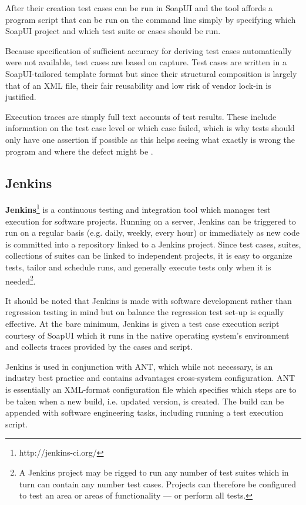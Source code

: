 \documentclass[12pt,a4paper,oneside,pdftex]{report}
\begin{document}
{{After their creation test cases can be run in SoapUI and the tool affords a program script that can be run on the command line simply by specifying which SoapUI project and which test suite or cases should be run.

Because specification of sufficient accuracy for deriving test cases automatically were not available, test cases are based on capture. Test cases are written in a SoapUI-tailored template format but since their structural composition is largely that of an XML file, their fair reusability and low risk of vendor lock-in is justified. 

Execution traces are simply full text accounts of test results. These include information on the test case level or which case failed, which is why tests should only have one assertion if possible as this helps seeing what exactly is wrong the program and where the defect might be \citep{duvall2007continuous}.

\subsection{Jenkins}

\textbf{Jenkins}\footnote{http://jenkins-ci.org/} is a continuous testing and integration tool which manages test execution for software projects. Running on a server, Jenkins can be triggered to run on a regular basis (e.g. daily, weekly, every hour) or immediately as new code is committed into a repository linked to a Jenkins project. Since test cases, suites, collections of suites can be linked to independent projects, it is easy to organize tests, tailor and schedule runs, and generally execute tests only when it is needed\footnote{A Jenkins project may be rigged to run any number of test suites which in turn can contain any number test cases. Projects can therefore be configured to test an area or areas of functionality --- or perform all tests.}.

It should be noted that Jenkins is made with software development rather than regression testing in mind but on balance the regression test set-up is equally effective. At the bare minimum, Jenkins is given a test case execution script courtesy of SoapUI which it runs in the native operating system's environment and collects traces provided by the cases and script.

Jenkins is used in conjunction with ANT, which while not necessary, is an industry best practice and contains advantages cross-system configuration. ANT is essentially an XML-format configuration file which specifies which steps are to be taken when a new build, i.e. updated version, is created. The build can be appended with software engineering tasks, including running a test execution script. 

}}
\end{document}
